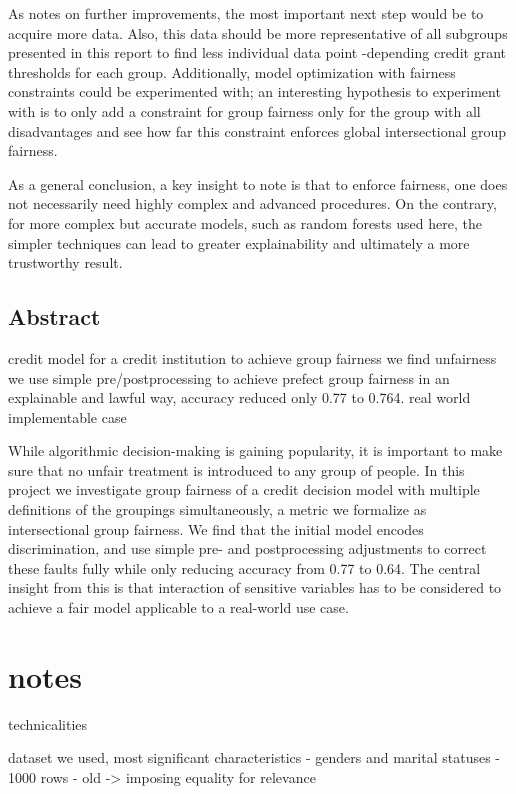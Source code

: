 \documentclass{article}
\begin{document}
As notes on further improvements, the most important next step would be to acquire more data. Also, this data should 
be more representative of all subgroups presented in this report to find less individual data point -depending credit grant thresholds for each group.
Additionally, model optimization with fairness constraints could be experimented with; an interesting hypothesis to experiment with is 
to only add a constraint for group fairness only for the group with all disadvantages and see how far this 
constraint enforces global intersectional group fairness.

As a general conclusion, a key insight to note is that to enforce fairness, one does not necessarily need highly complex and advanced 
procedures. On the contrary, for more complex but accurate models, such as random forests used here, the simpler techniques can
lead to greater explainability and ultimately a more trustworthy result.

\subsection*{Abstract}

credit model for a credit institution to achieve group fairness
we find unfairness
we use simple pre/postprocessing to achieve prefect group fairness in an explainable and lawful way, accuracy reduced only 0.77 to 0.764.
real world implementable case

While algorithmic decision-making is gaining popularity, it is important to make sure
that no unfair treatment is introduced to any group of people. In this project we investigate 
group fairness of a credit decision model with multiple definitions of the groupings 
simultaneously, a metric we formalize as intersectional group fairness. We find that 
the initial model encodes discrimination, and use simple pre- and postprocessing adjustments 
to correct these faults fully while only reducing accuracy from 0.77 to 0.64. The central insight from this is 
that interaction of sensitive variables has to be considered to achieve a fair model applicable to a real-world use case.

\section*{notes}

technicalities 

dataset we used, most significant characteristics
    - genders and marital statuses
    - 1000 rows
    - old -> imposing equality for relevance
\end{document}
